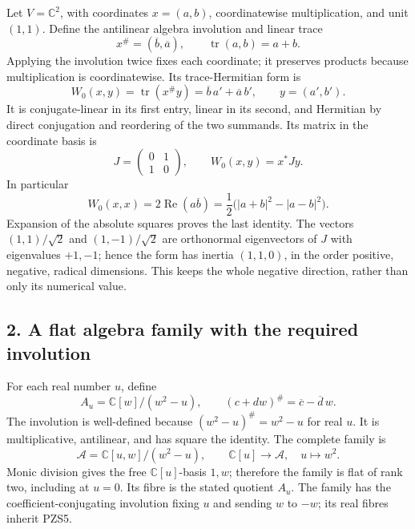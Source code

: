 \documentclass[
  10pt,
  a4paper,
]{article}
\begin{document}
Let \(V=\mathbb C^2\), with coordinates \(x=(a,b)\), coordinatewise
multiplication, and unit \((1,1)\). Define the antilinear algebra
involution and linear trace \[
x^\#=(\overline b,\overline a),\qquad
\operatorname{tr}(a,b)=a+b.
\tag{PZS1}
\] Applying the involution twice fixes each coordinate; it preserves
products because multiplication is coordinatewise. Its trace-Hermitian
form is \[
W_0(x,y)=\operatorname{tr}(x^\#y)
=\overline b\,a'+\overline a\,b',
\qquad y=(a',b').
\tag{PZS2}
\] It is conjugate-linear in its first entry, linear in its second, and
Hermitian by direct conjugation and reordering of the two summands. Its
matrix in the coordinate basis is \[
J=\begin{pmatrix}0&1\\1&0\end{pmatrix},
\qquad W_0(x,y)=x^*Jy.
\tag{PZS3}
\] In particular \[
W_0(x,x)=2\operatorname{Re}(a\overline b)
=\frac12\bigl(|a+b|^2-|a-b|^2\bigr).
\tag{PZS4}
\] Expansion of the absolute squares proves the last identity. The
vectors \((1,1)/\sqrt2\) and \((1,-1)/\sqrt2\) are orthonormal
eigenvectors of \(J\) with eigenvalues \(+1,-1\); hence the form has
inertia \((1,1,0)\), in the order positive, negative, radical
dimensions. This keeps the whole negative direction, rather than only
its numerical value.

\subsection{2. A flat algebra family with the required
involution}\label{a-flat-algebra-family-with-the-required-involution}

For each real number \(u\), define \[
A_u=\mathbb C[w]/(w^2-u),\qquad
(c+dw)^\#=\overline c-\overline d\,w.
\tag{PZS5}
\] The involution is well-defined because \((w^2-u)^\#=w^2-u\) for real
\(u\). It is multiplicative, antilinear, and has square the identity.
The complete family is \[
\mathcal A=\mathbb C[u,w]/(w^2-u),\qquad
\mathbb C[u]\longrightarrow\mathcal A,
\quad u\longmapsto w^2.
\tag{PZS6}
\] Monic division gives the free \(\mathbb C[u]\)-basis \(1,w\);
therefore the family is flat of rank two, including at \(u=0\). Its
fibre is the stated quotient \(A_u\). The family has the
coefficient-conjugating involution fixing \(u\) and sending \(w\) to
\(-w\); its real fibres inherit PZS5.
\end{document}
